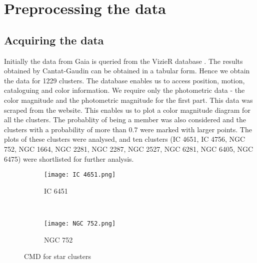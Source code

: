 \chapter{Preprocessing the data}\label{ch:ch2}

\section{Acquiring the data}
Initially the data from Gaia is queried from the VizieR database \citep{vizier}. The results obtained by Cantat-Gaudin \citep{cg} can be obtained in a tabular form. Hence we obtain the data for 1229 clusters. The database enables us to access position, motion, cataloguing and color information. We require only the photometric data - the color magnitude and the photometric magnitude for the first part. This data was scraped from the website. This enables us to plot a color magnitude diagram for all the clusters. The probablity of being a member was also considered and the clusters with a probability of more than $0.7$ were marked with larger points. The plots of these clusters were analysed, and ten clusters (IC 4651, IC 4756, NGC 752, NGC 1664, NGC 2281, NGC 2287, NGC 2527, NGC 6281, NGC 6405, NGC 6475) were shortlisted for further analysis.


\begin{figure}[h]
 \centering
 \begin{subfigure}[b]{0.45\textwidth}
   \centering
   \texttt{[image: IC 4651.png]}
   \caption{IC 6451}
   \label{fig:im1}
  \end{subfigure}
 ~
 \begin{subfigure}[b]{0.45\textwidth}
   \centering
   \texttt{[image: NGC 752.png]}
   \caption{NGC 752}
   \label{fig:im2}
 \end{subfigure}
 \caption{CMD for star clusters}
 \label{fig:subfigs_cap1}
\end{figure} 


 
 